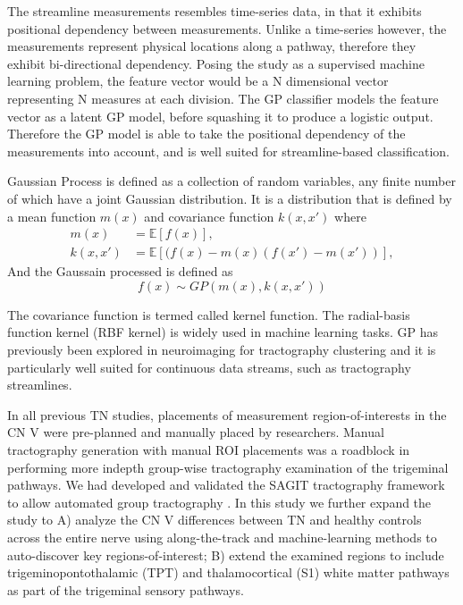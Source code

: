 The streamline measurements resembles time-series data, in that it exhibits positional dependency between measurements. Unlike a time-series however, the measurements represent physical locations along a pathway, therefore they exhibit bi-directional dependency. Posing the study as a supervised machine learning problem, the feature vector would be a N dimensional vector representing N measures at each division. The GP classifier models the feature vector as a latent GP model, before squashing it to produce a logistic output. Therefore the GP model is able to take the positional dependency of the measurements into account, and is well suited for streamline-based classification.

Gaussian Process is defined \cite{rasmussen2006gaussian} as a collection of random variables, any finite number of which have a joint Gaussian distribution. 
It is a distribution that is defined by a mean function $m(x)$ and covariance function $k(x,x') $ where
\begin{equation}
	\begin{split}
		m(x) &= \mathbb{E}[f(x)], \\
		k(x,x') &= \mathbb{E}[(f(x)-m(x)(f(x')-m(x'))],
	\end{split}
\end{equation}
And the Gaussain processed is defined as
\begin{equation}
f(x) \sim GP(m(x), k(x, x')) 
\end{equation}

The covariance function is termed called kernel function. The radial-basis function kernel (RBF kernel) is widely used in machine learning tasks. GP has previously been explored in neuroimaging for tractography clustering \cite{Wassermann2010} and it is particularly well suited for continuous data streams, such as tractography streamlines.

In all previous TN studies, placements of measurement region-of-interests in the CN V were pre-planned and manually placed by researchers. Manual tractography generation with manual ROI placements was a roadblock in performing more indepth group-wise tractography examination of the trigeminal pathways. We had developed and validated the SAGIT tractography framework to allow automated group tractography \cite{Chen2016}. In this study we further expand the study to A) analyze the CN V differences between TN and healthy controls across the entire nerve using along-the-track and machine-learning methods to auto-discover key regions-of-interest; B) extend the examined regions to include trigeminopontothalamic (TPT) and thalamocortical (S1) white matter pathways as part of the trigeminal sensory pathways.

